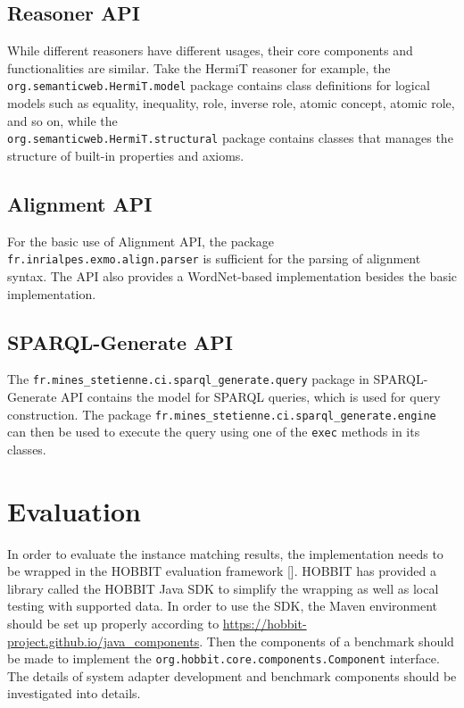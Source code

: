 \subsection{Reasoner API}

While different reasoners have different usages, their core components and functionalities are similar. Take the HermiT reasoner for example, the \texttt{org.semanticweb.HermiT.model} package contains class definitions for logical models such as equality, inequality, role, inverse role, atomic concept, atomic role, and so on, while the \\
\texttt{org.semanticweb.HermiT.structural} package contains classes that manages the structure of built-in properties and axioms.

\subsection{Alignment API}

For the basic use of Alignment API, the package \texttt{fr.inrialpes.exmo.align.parser} is sufficient for the parsing of alignment syntax. The API also provides a WordNet-based implementation besides the basic implementation.

\subsection{SPARQL-Generate API}

The \texttt{fr.mines\_stetienne.ci.sparql\_generate.query} package in SPARQL-Generate API contains the model for SPARQL queries, which is used for query construction. The package \texttt{fr.mines\_stetienne.ci.sparql\_generate.engine} can then be used to execute the query using one of the \texttt{exec} methods in its classes.

\section{Evaluation}

In order to evaluate the instance matching results, the implementation needs to be wrapped in the HOBBIT evaluation framework []. HOBBIT has provided a library called the HOBBIT Java SDK to simplify the wrapping as well as local testing with supported data. In order to use the SDK, the Maven environment should be set up properly according to \url{https://hobbit-project.github.io/java_components}. Then the components of a benchmark should be made to implement the \texttt{org.hobbit.core.components.Component} interface. The details of system adapter development and benchmark components should be investigated into details.
